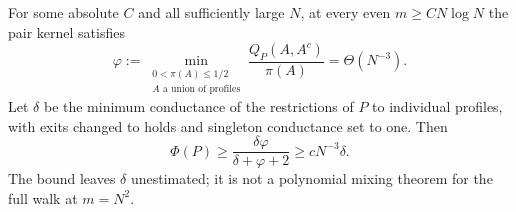 \begin{theorem}
\label{thm:long-profile-conductance}
For some absolute $C$ and all sufficiently large $N$, at every even
$m\ge CN\log N$ the pair kernel satisfies
\[
 \varphi:=\min_{\substack{0<\pi(A)\le1/2\\
                         A\text{ a union of profiles}}}
       \frac{Q_P(A,A^c)}{\pi(A)}=\Theta(N^{-3}).
\]
Let $\delta$ be the minimum conductance of the restrictions of $P$ to
individual profiles, with exits changed to holds and singleton
conductance set to one.  Then
\[
 \Phi(P)\ge\frac{\delta\varphi}{\delta+\varphi+2}
          \ge cN^{-3}\delta.
\]
The bound leaves $\delta$ unestimated; it is not a polynomial mixing
theorem for the full walk at $m=N^2$.
\end{theorem}

